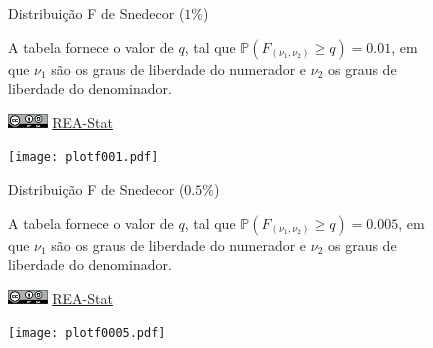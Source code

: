 \documentclass[12pt]{article}
\begin{document}
\newpage


\begin{landscape}

\begin{figure}[h]
\begin{minipage}[c]{1\textwidth}

\begin{Huge}
Distribuição F de Snedecor ($1\%$)
\end{Huge}

\vspace{2em}

A tabela fornece o valor de $q$, tal que $\mathbb{P}(F_{(\nu_1, \nu_2)} \geq q) = 0.01$, em que $\nu_1$ são os graus de liberdade do numerador e $\nu_2$ os graus de liberdade do denominador. 
\par\bigskip
\href{https://creativecommons.org/licenses/by-sa/4.0/deed.pt_BR}{\includegraphics[height=1em]{cc-by-sa.pdf}}
\href{https://rea-stat.github.io}{REA-Stat}
\end{minipage}
\hfill
\begin{minipage}[c]{.35\textwidth}
\texttt{[image: plotf001.pdf]}
\end{minipage}
\end{figure}  



\end{landscape}


\newpage


\begin{landscape}

\begin{figure}[h]
\begin{minipage}[c]{1\textwidth}

\begin{Huge}
Distribuição F de Snedecor ($0.5\%$)
\end{Huge}

\vspace{2em}

A tabela fornece o valor de $q$, tal que $\mathbb{P}(F_{(\nu_1, \nu_2)} \geq q) = 0.005$, em que $\nu_1$ são os graus de liberdade do numerador e $\nu_2$ os graus de liberdade do denominador. 
\par\bigskip
\href{https://creativecommons.org/licenses/by-sa/4.0/deed.pt_BR}{\includegraphics[height=1em]{cc-by-sa.pdf}}
\href{https://rea-stat.github.io}{REA-Stat}
\end{minipage}
\hfill
\begin{minipage}[c]{.35\textwidth}
\texttt{[image: plotf0005.pdf]}
\end{minipage}
\end{figure}  

\addtolength{\tabcolsep}{-2pt}  


\end{landscape}
\end{document}
